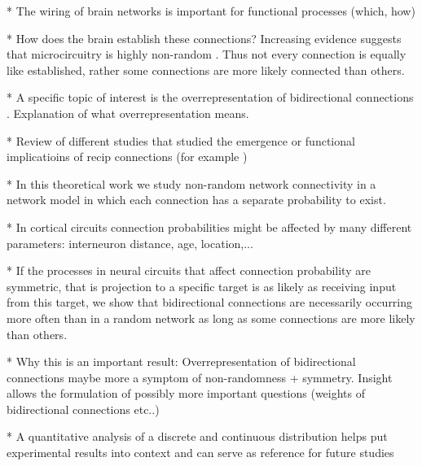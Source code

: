 
* The wiring of brain networks is important for functional processes (which, how)

* How does the brain establish these connections? Increasing evidence suggests that microcircuitry is highly non-random \cite{Song2005,Perin2011}. Thus not every connection is equally like established, rather some connections are more likely connected than others.

* A specific topic of interest is the overrepresentation of bidirectional connections \cite{Markram1997,Song2005}. Explanation of what overrepresentation means.

* Review of different studies that studied the emergence or functional implicatioins of recip connections (for example \cite{Clopath2010})

* In this theoretical work we study non-random network connectivity in a network model in which each connection has a separate probability to exist.

* In cortical circuits connection probabilities might be affected by many different parameters: interneuron distance, age, location,...

* If the processes in neural circuits that affect connection probability are symmetric, that is projection to a specific target is as likely as receiving input from this target, we show that bidirectional connections are necessarily occurring more often than in a random network as long as some connections are more likely than others.

* Why this is an important result: Overrepresentation of bidirectional connections maybe more a symptom of non-randomness + symmetry. Insight allows the formulation of possibly more important questions (weights of bidirectional connections etc..)

* A quantitative analysis of a discrete and continuous distribution helps put experimental results into context and can serve as reference for future studies



